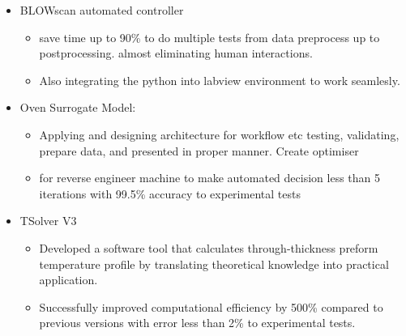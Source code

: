 \documentclass[11pt]{resume} %
\begin{document}
\begin{itemize}
    \vspace{-1mm}
    \item {BLOWscan automated controller}
        \vspace{-1.5mm}
        \begin{itemize}
            \item{
                save time up to 90\% to do multiple tests from data preprocess up to postprocessing.
                almost eliminating human interactions.
                }
            \vspace{-2mm}
            \item{
                Also integrating the python into labview environment to work seamlesly.
                }
        \end{itemize}

    
    \vspace{-1mm}
    \item {Oven Surrogate Model:}
        \vspace{-1.5mm}
        \begin{itemize}
            \item{
                Applying and designing architecture for workflow etc
                testing, validating, prepare data, and presented in proper manner. 
                Create optimiser
                }
            \vspace{-2mm}
            \item{
                for reverse engineer machine to make automated decision less than 5 iterations 
                with 99.5\% accuracy to experimental tests
                }
        \end{itemize}
    \vspace{-1mm}
    
    \vspace{-1mm}
    \item{TSolver V3} 
        \vspace{-1.5mm}
        \begin{itemize}
            \item{
                Developed a software tool that calculates through-thickness preform 
                temperature profile by translating theoretical knowledge into practical application.
                }
            \vspace{-2mm}
            \item{
                Successfully improved computational efficiency by 500\% compared to previous versions with 
                error less than 2\% to experimental tests.
                }
        \end{itemize}
    \vspace{-1mm}


\end{itemize}
\end{document}
